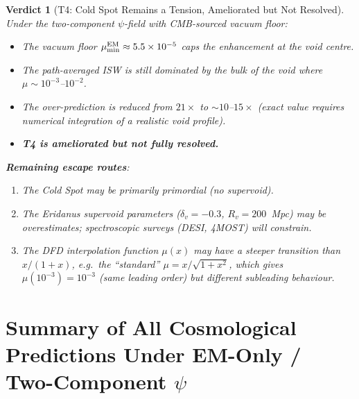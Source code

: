 \documentclass[11pt]{article}
\newtheorem{verdict}{Verdict}
\newcommand{\ee}[1]{\times 10^{#1}}
\newcommand{\mufd}{\mu}
\newcommand{\mumin}{\mu_{\rm min}}
\begin{document}
\begin{verdict}[T4: Cold Spot Remains a Tension, Ameliorated but Not Resolved]
\label{verdict:T4-W3i5}
Under the two-component $\psi$-field with CMB-sourced vacuum floor:
\begin{itemize}[nosep]
  \item The vacuum floor $\mumin^{\rm EM} \approx 5.5\ee{-5}$ caps the
    enhancement at the void centre.
  \item The path-averaged ISW is still dominated by the bulk of the void
    where $\mufd \sim 10^{-3}$--$10^{-2}$.
  \item The over-prediction is reduced from $21\times$ to $\sim 10$--$15\times$
    (exact value requires numerical integration of a realistic void profile).
  \item \textbf{T4 is ameliorated but not fully resolved.}
\end{itemize}

\textbf{Remaining escape routes}:
\begin{enumerate}[nosep]
  \item The Cold Spot may be primarily primordial (no supervoid).
  \item The Eridanus supervoid parameters ($\delta_v = -0.3$, $R_v = 200$~Mpc)
    may be overestimates; spectroscopic surveys (DESI, 4MOST) will constrain.
  \item The DFD interpolation function $\mufd(x)$ may have a steeper
    transition than $x/(1+x)$, e.g.\ the ``standard'' $\mufd = x/\sqrt{1+x^2}$,
    which gives $\mufd(10^{-3}) = 10^{-3}$ (same leading order) but different
    subleading behaviour.
\end{enumerate}
\end{verdict}

\section{Summary of All Cosmological Predictions Under EM-Only / Two-Component $\psi$}
\label{sec:cosmo-summary}
\end{document}
